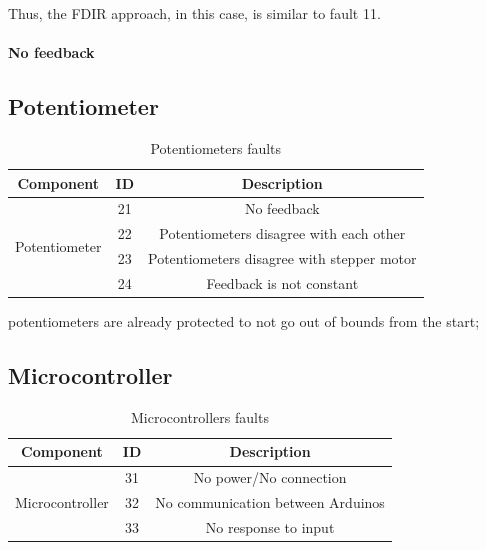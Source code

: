 Thus, the FDIR approach, in this case, is similar to fault 11.



\paragraph{No feedback\\}

 












\subsection{Potentiometer}
















\begin{table}[H]
    \centering
    \begin{tabular}{c|c|c}
        Component & ID & Description \\ \hline \hline
        \multirow{4}{*}{Potentiometer} & 21 & No feedback \\ \cline{2-3}
            & 22 & Potentiometers disagree with each other\\ \cline{2-3}
            & 23 & Potentiometers disagree with stepper motor \\ \cline{2-3}
            & 24 & Feedback is not constant \\\hline
    \end{tabular}
    \caption{Potentiometers faults}
    \label{tab:pot_faults}
\end{table}

potentiometers are already protected to not go out of bounds from the start;

\subsection{Microcontroller}

\begin{table}[H]
    \centering
    \begin{tabular}{c|c|c}
        Component & ID & Description \\ \hline \hline
        \multirow{3}{*}{Microcontroller} & 31 & No power/No connection \\ \cline{2-3}
            & 32 & No communication between Arduinos\\ \cline{2-3}
            & 33 & No response to input \\ \hline
    \end{tabular}
    \caption{Microcontrollers faults}
    \label{tab:microcontroller_faults}
\end{table}